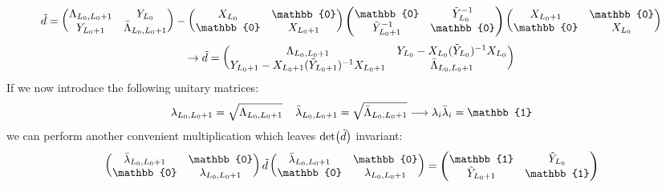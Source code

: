 \begin{equation}
    \Tilde{d} = \begin{pmatrix}
        \Lambda_{L_0, L_0 + 1} & Y_{L_0} \\
        Y_{L_0 + 1} & \Bar{\Lambda}_{L_0, L_0 + 1} \\ 
    \end{pmatrix} - \begin{pmatrix}
        X_{L_0} & \mathbb{0} \\
        \mathbb{0} &  X_{L_0 + 1} \\ 
    \end{pmatrix} \begin{pmatrix}
        \mathbb{0} & \Tilde{Y}_{L_0}^{-1} \\
        \Tilde{Y}_{L_0 + 1}^{-1} & \mathbb{0} \\ 
    \end{pmatrix}\begin{pmatrix}
        X_{L_0 + 1} & \mathbb{0} \\
        \mathbb{0} &  X_{L_0} \\ 
    \end{pmatrix}
\end{equation}
\begin{equation}
    \rightarrow \Tilde{d} = \begin{pmatrix}
        \Lambda_{L_0, L_0 + 1} & Y_{L_0} - X_{L_0} (\Tilde{Y}_{L_0})^{-1} X_{L_0} \\
        Y_{L_0 + 1} - X_{L_0 + 1} (\Tilde{Y}_{L_0 + 1})^{-1} X_{L_0 + 1} & \Bar{\Lambda}_{L_0, L_0 + 1} \\ 
    \end{pmatrix}
\end{equation}
If we now introduce the following unitary matrices:
\begin{equation}
    \lambda_{L_0, L_0 + 1} = \sqrt{\Lambda_{L_0, L_0 + 1}} \hspace{4mm} \Bar{\lambda}_{L_0, L_0 + 1} = \sqrt{\Bar{\Lambda}_{L_0, L_0 + 1}} \longrightarrow \lambda_i \Bar{\lambda}_i = \mathbb{1}
\end{equation}
we can perform another convenient multiplication which leaves $\det(\Tilde{d})$ invariant:
\begin{equation}
    \begin{pmatrix}
        \Bar{\lambda}_{L_0, L_0 + 1} & \mathbb{0} \\
        \mathbb{0} & \lambda_{L_0, L_0 + 1} \\
    \end{pmatrix} \Tilde{d} \begin{pmatrix}
        \Bar{\lambda}_{L_0, L_0 + 1} & \mathbb{0} \\
        \mathbb{0} & \lambda_{L_0, L_0 + 1} \\
    \end{pmatrix} = \begin{pmatrix}
        \mathbb{1} & \hat{Y}_{L_0} \\
        \hat{Y}_{L_0 + 1} & \mathbb{1} \\
    \end{pmatrix} 
\end{equation}
